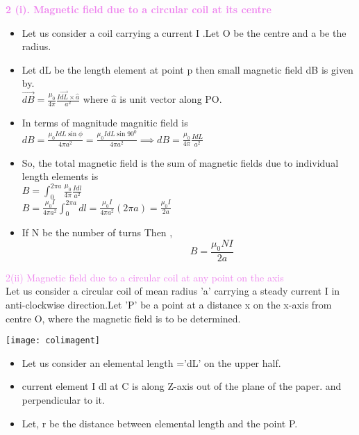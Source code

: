 \documentclass{beamer}
\begin{document}
\begin{frame}
\textcolor{violet}{\textbf{2 (i). Magnetic field due to a circular coil at its centre }}\\
\begin{itemize}
\item Let us consider a coil carrying a current I .Let O be the centre and a be the radius.
\item Let dL be the length element at point p then small magnetic field dB is given by.\\
\hspace{2cm} $\vec{dB}=\frac{\mu_0}{4\pi}\frac{I\vec{dL}\times\hat{a}}{a^2}$ where $\hat{a}$ is unit vector along PO.
\item In terms of magnitude magnitic field is $dB=\frac{\mu_0 IdL\sin\phi}{4\pi a^2}=\frac{\mu_0 IdL\sin 90^0}{4\pi a^2} \implies dB=\frac{\mu_0}{4\pi}\frac{IdL}{a^2}$ 
\item So, the total magnetic field is the sum of magnetic fields due to
individual length elements is \\
\hspace{2cm} $B=\int_{0}^{2\pi a}\frac{\mu_0}{4\pi}\frac{Idl}{a^2} $\\
\hspace{4cm} $B=\frac{\mu_0 I}{4\pi a^2}\int_{0}^{2\pi a}dl=\frac{\mu_0 I}{4\pi a^2}(2\pi a)=\frac{\mu_0 I}{2a}$\\
\item If N be the number of turns Then ,\\
\begin{equation}
\hspace{2cm} B=\frac{\mu_0 N I}{2a}
\end{equation}
\end{itemize}


\end{frame}



\begin{frame}
\textcolor{violet}{2(ii) Magnetic field due to a circular coil at any point on the axis }\\
Let us consider a circular coil of mean radius 'a' carrying a
steady current I in anti-clockwise direction.Let 'P' be a point at a distance x on the x-axis from centre O, where the magnetic field is to be determined.\\
\begin{center}
\texttt{[image: colimagent]}
\end{center}

\begin{itemize}
\item  Let us consider an elemental length ='dL' on the upper half.
\item current element I dl at C is along Z-axis out of the plane of the paper. and perpendicular to it.
\item Let, r be the distance between elemental length and the point P.

\end{itemize}
\end{frame}
\end{document}
